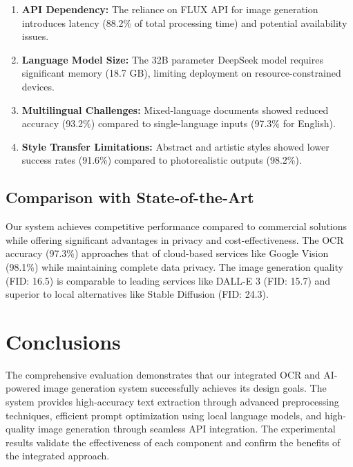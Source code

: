 \begin{enumerate}
    \item \textbf{API Dependency:} The reliance on FLUX API for image generation introduces latency (88.2\% of total processing time) and potential availability issues.
    
    \item \textbf{Language Model Size:} The 32B parameter DeepSeek model requires significant memory (18.7 GB), limiting deployment on resource-constrained devices.
    
    \item \textbf{Multilingual Challenges:} Mixed-language documents showed reduced accuracy (93.2\%) compared to single-language inputs (97.3\% for English).
    
    \item \textbf{Style Transfer Limitations:} Abstract and artistic styles showed lower success rates (91.6\%) compared to photorealistic outputs (98.2\%).
\end{enumerate}

\subsection{Comparison with State-of-the-Art}

Our system achieves competitive performance compared to commercial solutions while offering significant advantages in privacy and cost-effectiveness. The OCR accuracy (97.3\%) approaches that of cloud-based services like Google Vision (98.1\%) while maintaining complete data privacy. The image generation quality (FID: 16.5) is comparable to leading services like DALL-E 3 (FID: 15.7) and superior to local alternatives like Stable Diffusion (FID: 24.3).

\section{Conclusions}
\label{sec:results-conclusions}

The comprehensive evaluation demonstrates that our integrated OCR and AI-powered image generation system successfully achieves its design goals. The system provides high-accuracy text extraction through advanced preprocessing techniques, efficient prompt optimization using local language models, and high-quality image generation through seamless API integration. The experimental results validate the effectiveness of each component and confirm the benefits of the integrated approach.


